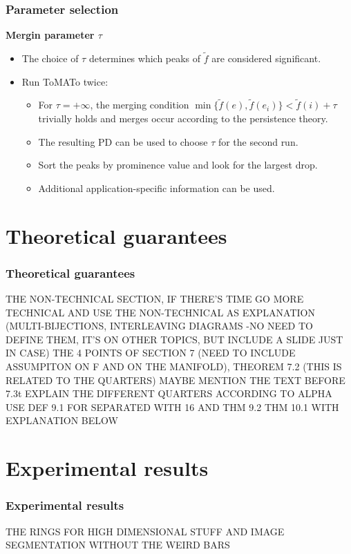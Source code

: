\documentclass{beamer}
\theoremstyle{definition}
\begin{document}
\begin{frame}
\frametitle{Parameter selection}
\textbf{Mergin parameter $\tau$}
\begin{itemize}
\item<1-> The choice of $\tau$ determines which peaks of $\tilde{f}$ are considered significant. %
\item<2-> Run ToMATo twice: 
\begin{itemize}
\item<3-> For $\tau=+\infty$, the merging condition $\min\{\tilde{f}(e),\tilde{f}(e_i)\}<\tilde{f}(i)+\tau$ trivially holds and merges occur according to the persistence theory.
\item<4-> The resulting PD can be used to choose $\tau$ for the second run.
\item<5-> Sort the peaks by prominence value and look for the largest drop. %
\item<6-> Additional application-specific information can be used.
\end{itemize}
\end{itemize}
\end{frame}


\section{Theoretical guarantees}
\begin{frame}
\frametitle{Theoretical guarantees}
THE NON-TECHNICAL SECTION, IF THERE'S TIME GO MORE TECHNICAL AND USE THE NON-TECHNICAL AS EXPLANATION (MULTI-BIJECTIONS, INTERLEAVING DIAGRAMS -NO NEED TO DEFINE THEM, IT'S ON OTHER TOPICS, BUT INCLUDE A SLIDE JUST IN CASE)
THE 4 POINTS OF SECTION 7 (NEED TO INCLUDE ASSUMPITON ON F AND ON THE MANIFOLD), THEOREM 7.2 (THIS IS RELATED TO THE QUARTERS) MAYBE MENTION THE TEXT BEFORE 7.3t
EXPLAIN THE DIFFERENT QUARTERS ACCORDING TO ALPHA
USE DEF 9.1 FOR SEPARATED WITH 16 AND THM 9.2
THM 10.1 WITH EXPLANATION BELOW
\end{frame}

\section{Experimental results}
\begin{frame}
\frametitle{Experimental results}
THE RINGS FOR HIGH DIMENSIONAL STUFF AND IMAGE SEGMENTATION WITHOUT THE WEIRD BARS
\end{frame}
\end{document}
